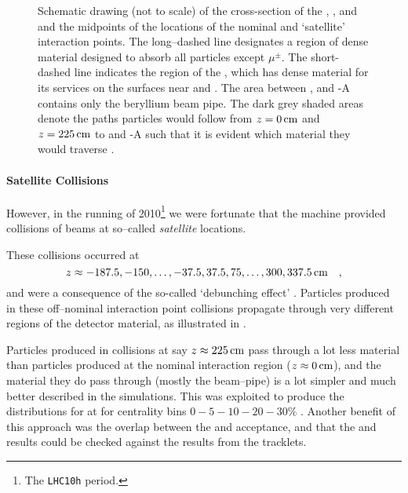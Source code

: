 \begin{figure}[th!bp]
  \centering
  \caption{Schematic drawing (not to scale) of the cross-section of
    the \ITS{}, \FMD{}, and \VZERO{} and the midpoints of the
    locations of the nominal and `satellite' interaction points. The
    long--dashed line designates a region of dense material designed
    to absorb all particles except $\mu^{\pm}$. The short-dashed line
    indicates the region of the \ALICE{} \ITS{}, which has dense
    material for its services on the surfaces near  and
    . The area between ,  and \VZERO{}-A contains
    only the beryllium beam pipe. The dark grey shaded areas denote
    the paths particles would follow from $z=\unit[0]{\text{cm}}$ and
    $z=\unit[225]{\text{cm}}$ to  and \VZERO{}-A such that it
    is evident which material they would traverse
    \cite{Abbas:2013bpa}.}
  \label{fig:satellite_geom}
\end{figure}

\paragraph{Satellite Collisions} 
However, in the \PbPbCol{} running of 2010\footnote{The
  \texttt{LHC10h} period.} we were fortunate that the machine provided
collisions of beams at so--called \emph{satellite} locations.

These collisions occurred at
$$
z \approx -187.5, -150, \ldots, -37.5, 37.5, 75, \ldots, 300,
\unit[337.5]{\text{cm}} \quad, 
$$ 
and were a consequence of the so-called `debunching effect'
\cite{maxime}.  Particles produced in these off--nominal interaction
point collisions propagate through very different regions of the
\ALICE{} detector material, as illustrated in
.

Particles produced in collisions at say
$z\approx\unit[225]{\text{cm}}$ pass through a lot less material than
particles produced at the nominal interaction region
($z\approx\unit[0]{\text{cm}}$), and the material they do pass through
(mostly the beam--pipe) is a lot simpler and much better described in
the simulations.  This was exploited to produce the \ndndeta{}
distributions for \PbPbCol{} at  for centrality bins
$0-5-10-20-30\%$ \cite{Abbas:2013bpa}.  Another benefit of this
approach was the overlap between the \FMD{} and \VZERO{} acceptance,
and that the \VZERO{} and \FMD{} results could be checked against the
results from the \SPD{} tracklets.

